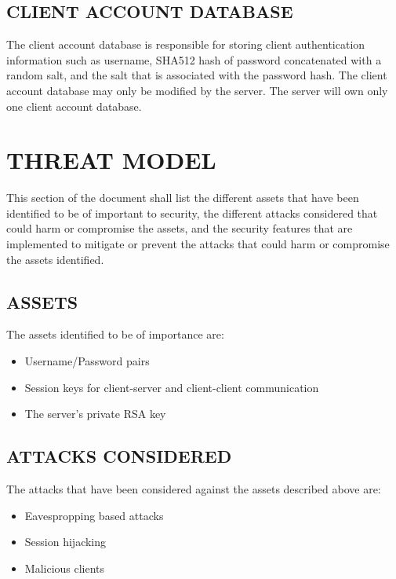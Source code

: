 \documentclass[twoside,letterpaper]{article}
\begin{document}
\subsection{CLIENT ACCOUNT DATABASE}
The client account database is responsible for storing client authentication information such as username, 
SHA512 hash of password concatenated with a random salt, and the salt that is associated with the password
hash. The client account database may only be modified by the server. The server will own only one client
account database.

\bigskip

\section{THREAT MODEL}
This section of the document shall list the different assets that have been identified to be of important to
security, the different attacks considered that could harm or compromise the assets, and the security features
that are implemented to mitigate or prevent the attacks that could harm or compromise the assets identified.

\bigskip

\subsection{ASSETS}
The assets identified to be of importance are:
 
 \begin{itemize}
 \item Username/Password pairs
 \item Session keys for client-server and client-client communication
 \item The server's private RSA key
 \end{itemize}
 
 \bigskip

\subsection{ATTACKS CONSIDERED}
The attacks that have been considered against the assets described above are:

\begin{itemize}
\item Eavespropping based attacks
\item Session hijacking
\item Malicious clients
\end{itemize}
\end{document}

